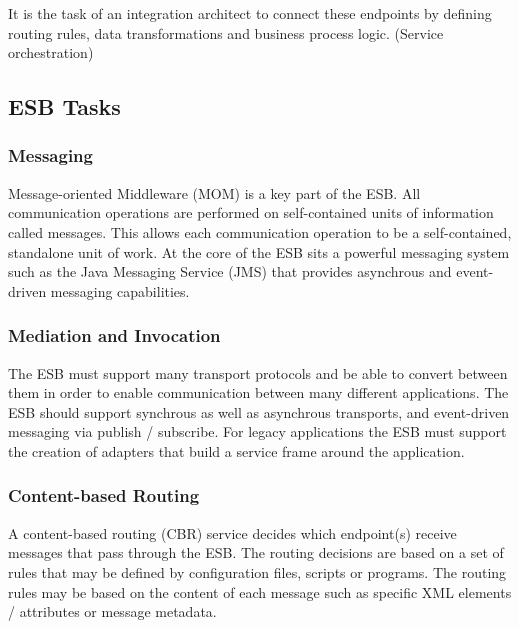 It is the task of an integration architect to connect these endpoints by
defining routing rules, data transformations and business process logic. (Service
orchestration)


\subsection{ESB Tasks}
\label{sec:esb-tasks}

\subsubsection{Messaging}
\label{subsec:messaging}
Message-oriented Middleware (MOM) is a key part of the ESB. All
communication operations are performed on self-contained units of information
called messages. This allows each communication operation to be a
self-contained, standalone unit of work.\supercite{chappell} At the core of the
ESB sits a powerful messaging system such as the Java Messaging Service (JMS)
that provides asynchrous and event-driven messaging capabilities.

\subsubsection{Mediation and Invocation}
\label{subsec:mediation-and-invocation}

The ESB must support many transport protocols and be able to convert between them
in order to enable communication between many different applications. The ESB
should support synchrous as well as asynchrous transports, and event-driven
messaging via publish / subscribe. For legacy applications the ESB must support
the creation of adapters that build a service frame around the application.

\subsubsection{Content-based Routing}
\label{subsec:content-based-routing}

A content-based routing (CBR) service decides which endpoint(s) receive messages
that pass through the ESB. The routing decisions are based on a set of rules
that may be defined by configuration files, scripts or programs. The routing
rules may be based on the content of each message such as specific XML
elements / attributes or message metadata.

